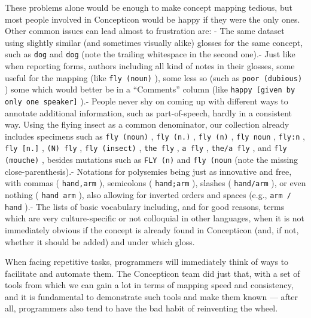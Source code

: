 \documentclass[
  a4paper,
  14pt,
  oneside,
  tablecaptionabove
]{scrbook}
\newcommand{\passthrough}[1]{#1}
\begin{document}
These problems alone would be enough to make concept mapping tedious,
but most people involved in Concepticon would be happy if they were the
only ones. Other common issues can lead almost to frustration are: - The
same dataset using slightly similar (and sometimes visually alike)
glosses for the same concept, such as \passthrough{\lstinline!dog!} and
\passthrough{\lstinline!dog!} (note the trailing whitespace in the
second one).- Just like when reporting forms, authors including all kind
of notes
in their glosses, some useful for the mapping (like
\passthrough{\lstinline!fly (noun)!} ), some
less so (such as \passthrough{\lstinline!poor (dubious)!} ) some which
would better be in a \enquote{Comments} column (like
\passthrough{\lstinline!happy [given by only one speaker]!} ).- People
never shy on coming up with different ways to annotate
additional information, such as part-of-speech, hardly in a consistent
way. Using the flying insect as a common denominator, our collection
already includes specimens such as \passthrough{\lstinline!fly (noun)!}
, \passthrough{\lstinline!fly (n.)!} , \passthrough{\lstinline!fly (n)!}
, \passthrough{\lstinline!fly noun!} , \passthrough{\lstinline!fly:n!} ,
\passthrough{\lstinline!fly [n.]!} , \passthrough{\lstinline!(N) fly!} ,
\passthrough{\lstinline!fly (insect)!} ,
\passthrough{\lstinline!the fly!} , \passthrough{\lstinline!a fly!} ,
\passthrough{\lstinline!the/a fly!} , and
\passthrough{\lstinline!fly (mouche)!} , besides mutations such as
\passthrough{\lstinline!FLY (n)!} and
\passthrough{\lstinline!fly (noun!} (note the missing
close-parenthesis).- Notations for polysemies being just as innovative
and free, with commas ( \passthrough{\lstinline!hand,arm!} ), semicolons
( \passthrough{\lstinline!hand;arm!} ), slashes (
\passthrough{\lstinline!hand/arm!} ), or even nothing (
\passthrough{\lstinline!hand arm!} ), also allowing for inverted orders
and spaces (e.g., \passthrough{\lstinline!arm / hand!} ).- The lists of
basic vocabulary including, and for good reasons, terms which are very
culture-specific or not colloquial in other languages, when it is not
immediately obvious if the concept is already found in Concepticon (and,
if not, whether it should be added) and under which gloss.

When facing repetitive tasks, programmers will immediately think of ways
to facilitate and automate them. The Concepticon team did just that,
with a set of tools from which we can gain a lot in terms of mapping
speed and consistency, and it is fundamental to demonstrate such tools
and make them known --- after all, programmers also tend to have the bad
habit of reinventing the wheel.
\end{document}

